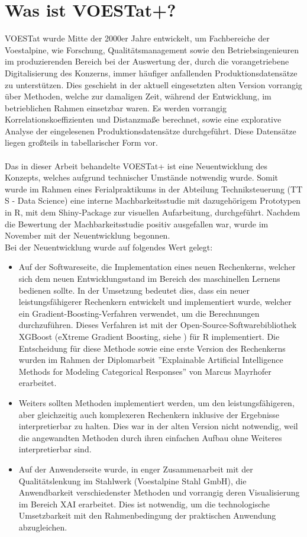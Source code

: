 \documentclass[12pt,titlepage,oneside]{book}
\begin{document}
\section{Was ist VOESTat+?}
VOESTat wurde Mitte der 2000er Jahre entwickelt, um Fachbereiche der Voestalpine, wie Forschung, Qualitätsmanagement sowie den Betriebsingenieuren im produzierenden Bereich bei der Auswertung der, durch die vorangetriebene Digitalisierung des Konzerns, immer häufiger anfallenden Produktionsdatensätze zu unterstützen. Dies geschieht in der aktuell eingesetzten alten Version vorrangig über Methoden, welche zur damaligen Zeit, während der Entwicklung, im betrieblichen Rahmen einsetzbar waren. Es werden vorrangig Korrelationskoeffizienten und Distanzmaße berechnet, sowie eine explorative Analyse der eingelesenen Produktionsdatensätze durchgeführt. Diese Datensätze liegen großteils in tabellarischer Form vor.\\ \\
Das in dieser Arbeit behandelte VOESTat+ ist eine Neuentwicklung des Konzepts, welches aufgrund technischer Umstände notwendig wurde. Somit wurde im Rahmen eines Ferialpraktikums in der Abteilung Techniksteuerung (TT S - Data Science) eine interne Machbarkeitsstudie mit dazugehörigem Prototypen in R, mit dem Shiny-Package zur visuellen Aufarbeitung, durchgeführt. Nachdem die Bewertung der Machbarkeitsstudie positiv ausgefallen war, wurde im November mit der Neuentwicklung begonnen.\\
Bei der Neuentwicklung wurde auf folgendes Wert gelegt:
\begin{itemize}
    \item Auf der Softwareseite, die Implementation eines neuen Rechenkerns, welcher sich dem neuen Entwicklungsstand im Bereich des maschinellen Lernens bedienen sollte. In der Umsetzung bedeutet dies, dass ein neuer leistungsfähigerer Rechenkern entwickelt und implementiert wurde, welcher ein  Gradient-Boosting-Verfahren verwendet, um die Berechnungen durchzuführen. Dieses Verfahren ist mit der Open-Source-Softwarebibliothek XGBoost (eXtreme Gradient Boosting, siehe \cite{Rxgboost}) für R implementiert. Die Entscheidung für diese Methode sowie eine erste Version des Rechenkerns wurden im Rahmen der Diplomarbeit ''Explainable Artificial Intelligence Methods for Modeling Categorical Responses'' von Marcus Mayrhofer erarbeitet.
    \item Weiters sollten Methoden implementiert werden, um den leistungsfähigeren, aber gleichzeitig auch komplexeren Rechenkern inklusive der Ergebnisse interpretierbar zu halten. Dies war in der alten Version nicht notwendig, weil die angewandten Methoden durch ihren einfachen Aufbau ohne Weiteres interpretierbar sind.
    \item Auf der Anwenderseite wurde, in enger Zusammenarbeit mit der Qualitätslenkung im Stahlwerk (Voestalpine Stahl GmbH), die Anwendbarkeit verschiedenster Methoden und vorrangig deren Visualisierung im Bereich XAI erarbeitet. Dies ist notwendig, um die technologische Umsetzbarkeit mit den Rahmenbedingung der praktischen Anwendung abzugleichen.
\end{itemize}
\end{document}
